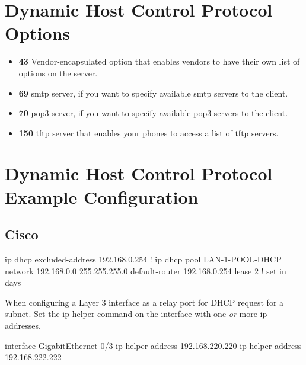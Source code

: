 \section[DHCP Options]{Dynamic Host Control Protocol Options}

\begin{itemize}
    \item \textbf{43} Vendor-encapsulated option that enables vendors to have their own list of options on the server.
    \item \textbf{69} \gls{smtp} server, if you want to specify available \gls{smtp} servers to the client.
    \item \textbf{70} \gls{pop3} server, if you want to specify available \gls{pop3} servers to the client.
    \item \textbf{150} \gls{tftp} server that enables your phones to access a list of \gls{tftp} servers.
\end{itemize}

\section[DHCP Example Configuration]{Dynamic Host Control Protocol Example Configuration}

\subsection{Cisco}

\begin{cisco}
ip dhcp excluded-address 192.168.0.254
!
ip dhcp pool LAN-1-POOL-DHCP
 network 192.168.0.0 255.255.255.0
 default-router 192.168.0.254
 lease 2 ! set in days
\end{cisco}

When configuring a Layer 3 interface as a relay port for DHCP request for a subnet. Set the ip helper command on the interface with one \textit{or} more ip addresses.

\begin{cisco}
interface GigabitEthernet 0/3
 ip helper-address 192.168.220.220
 ip helper-address 192.168.222.222
\end{cisco}
